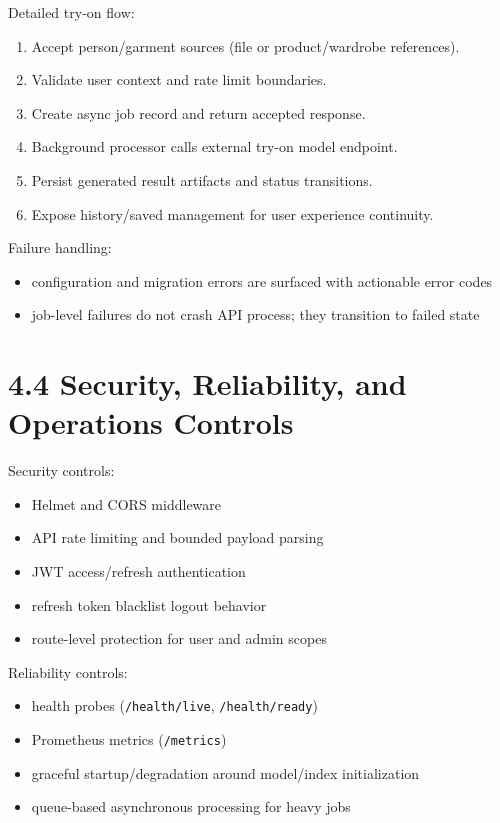 \documentclass[12pt,a4paper]{report}
\begin{document}
Detailed try-on flow:

\begin{enumerate}
\item Accept person/garment sources (file or product/wardrobe references).
\item Validate user context and rate limit boundaries.
\item Create async job record and return accepted response.
\item Background processor calls external try-on model endpoint.
\item Persist generated result artifacts and status transitions.
\item Expose history/saved management for user experience continuity.
\end{enumerate}

Failure handling:

\begin{itemize}
\item configuration and migration errors are surfaced with actionable error codes
\item job-level failures do not crash API process; they transition to failed state
\end{itemize}

\section{4.4 Security, Reliability, and Operations Controls}
Security controls:

\begin{itemize}
\item Helmet and CORS middleware
\item API rate limiting and bounded payload parsing
\item JWT access/refresh authentication
\item refresh token blacklist logout behavior
\item route-level protection for user and admin scopes
\end{itemize}

Reliability controls:

\begin{itemize}
\item health probes (\texttt{/health/live}, \texttt{/health/ready})
\item Prometheus metrics (\texttt{/metrics})
\item graceful startup/degradation around model/index initialization
\item queue-based asynchronous processing for heavy jobs
\end{itemize}
\end{document}
